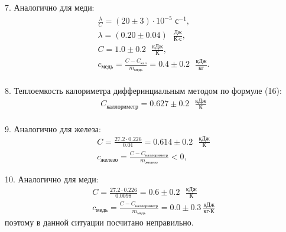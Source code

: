 7. Аналогично для меди:
\begin{align*}
    \frac \lambda C = (20 \pm 3) \cdot 10^{-5} \text{ с}^{-1}, \\
    \lambda = (0.20 \pm 0.04) \text{ }\frac{\text{Дж}}{\text{К}\cdot\text{с}}, \\
    C = 1.0 \pm 0.2  \text{ }\frac{\text{кДж}}{\text{К}}, \\
    c_\text{медь} = \frac{C - C_\text{кал}}{m_\text{медь}} = 0.4 \pm 0.2 \text{ } \frac{\text{кДж}}{\text{кг}}. \\
\end{align*}

8. Теплоемкость калориметра дифферинциальным методом по формуле (16):
\begin{align*}
    C_\text{каллориметр} = 0.627 \pm 0.2 \text{ } \frac{\text{кДж}}{\text{К}} \\
\end{align*}

9. Аналогично для железа:
\begin{align*}
    C = \frac{27.2 \cdot 0.226}{0.01} = 0.614 \pm 0.2 \text{ } \frac{\text{кДж}}{\text{К}} \\
    c_\text{железо} = \frac{C - C_\text{каллориметр}}{m_\text{железо}} < 0,
\end{align*}

10. Аналогично для меди:
\begin{align*}
    C = \frac{27.2 \cdot 0.226}{0.0098} = 0.6 \pm 0.2 \text{ } \frac{\text{кДж}}{\text{К}} \\
    c_\text{медь} = \frac{C - C_\text{каллориметр}}{m_\text{медь}} = 0.0 \pm 0.3 ~\frac{\text{кДж}}{\text{кг}\cdot\text{К}}
\end{align*}
поэтому в данной ситуации посчитано неправильно.
